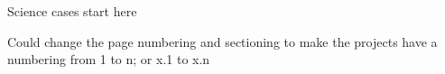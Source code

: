 \documentclass[11pt,a4paper]{article}
\begin{document}
    \listoftables
    \newpage
    
Science cases start here

Could change the page numbering and sectioning to make the
projects have a numbering from 1 to n; or x.1 to x.n

\newpage


\newpage

\fi


\maketitle



%

\newpage

% 

\newpage


\setcounter{figure}{0}
\setcounter{section}{0}

\renewcommand\thesection{\arabic{section}}





% 
% 

\newpage
\end{document}
